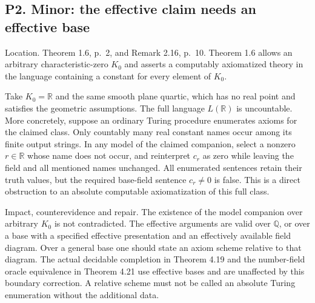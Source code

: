 \documentclass[10pt]{article}
\begin{document}
\subsection*{P2. Minor: the effective claim needs an effective base}
Location. Theorem 1.6, p. 2, and Remark 2.16, p. 10. Theorem 1.6 allows an arbitrary characteristic-zero \(K_0\) and asserts a computably axiomatized theory in the language containing a constant for every element of \(K_0\).\par
Take \(K_0=\mathbb R\) and the same smooth plane quartic, which has no real point and satisfies the geometric assumptions. The full language \(L(\mathbb R)\) is uncountable. More concretely, suppose an ordinary Turing procedure enumerates axioms for the claimed class. Only countably many real constant names occur among its finite output strings. In any model of the claimed companion, select a nonzero \(r\in\mathbb R\) whose name does not occur, and reinterpret \(c_r\) as zero while leaving the field and all mentioned names unchanged. All enumerated sentences retain their truth values, but the required base-field sentence \(c_r\ne0\) is false. This is a direct obstruction to an absolute computable axiomatization of this full class.\par
Impact, counterevidence and repair. The existence of the model companion over arbitrary \(K_0\) is not contradicted. The effective arguments are valid over \(\mathbb Q\), or over a base with a specified effective presentation and an effectively available field diagram. Over a general base one should state an axiom scheme relative to that diagram. The actual decidable completion in Theorem 4.19 and the number-field oracle equivalence in Theorem 4.21 use effective bases and are unaffected by this boundary correction. A relative scheme must not be called an absolute Turing enumeration without the additional data.\par
\end{document}
